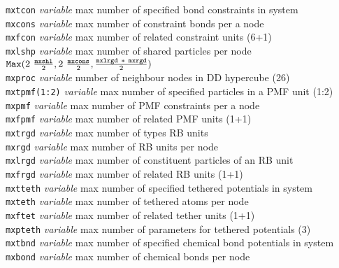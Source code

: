 \begin{tabbing}
\> {\tt mxtcon}      \> {\em variable}       \> max number of specified bond constraints in system \\
\> {\tt mxcons}      \> {\em variable}       \> max number of constraint bonds per a node \\
\> {\tt mxfcon}      \> {\em variable}       \> max number of related constraint units (6+1) \\
\> {\tt mxlshp}      \> {\em variable}       \> max number of shared particles per node \\
\>                   \>                      \> ${\tt Max} (2~\frac{\tt mxshl}{2},2~\frac{\tt mxcons}{2},\frac{{\tt mxlrgd}~*~{\tt mxrgd}}{2})$ \\
\> {\tt mxproc}      \> {\em variable}       \> number of neighbour nodes in DD hypercube (26) \\
\> {\tt mxtpmf(1:2)} \> {\em variable}       \> max number of specified particles in a PMF unit (1:2) \\
\> {\tt mxpmf}       \> {\em variable}       \> max number of PMF constraints per a node \\
\> {\tt mxfpmf}      \> {\em variable}       \> max number of related PMF units (1+1) \\
\> {\tt mxtrgd}      \> {\em variable}       \> max number of types RB units \\
\> {\tt mxrgd}       \> {\em variable}       \> max number of RB units per node \\
\> {\tt mxlrgd}      \> {\em variable}       \> max number of constituent particles of an RB unit \\
\> {\tt mxfrgd}      \> {\em variable}       \> max number of related RB units (1+1) \\
\> {\tt mxtteth}     \> {\em variable}       \> max number of specified tethered potentials in system \\
\> {\tt mxteth}      \> {\em variable}       \> max number of tethered atoms per node \\
\> {\tt mxftet}      \> {\em variable}       \> max number of related tether units (1+1) \\
\> {\tt mxpteth}     \> {\em variable}       \> max number of parameters for tethered potentials (3) \\
\> {\tt mxtbnd}      \> {\em variable}       \> max number of specified chemical bond potentials in system \\
\> {\tt mxbond}      \> {\em variable}       \> max number of chemical bonds per node \\

\end{tabbing}
